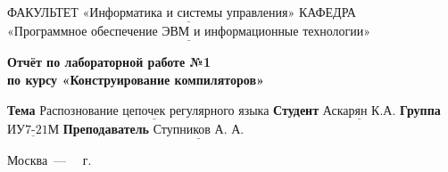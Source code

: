 \begin{titlepage}
	
	\noindent ФАКУЛЬТЕТ $\underline{\text{«Информатика и системы управления»}}$ \newline\newline
	\noindent КАФЕДРА $\underline{\text{«Программное обеспечение ЭВМ и информационные технологии»}}$\newline\newline\newline\newline\newline\newline\newline
	
	\vspace{\baselineskip}

	\begin{center}
		\Large\textbf{Отчёт по лабораторной работе №1} \\
		\Large\textbf{по курсу «Конструирование компиляторов»} \\

	\end{center}
	\begin{center}
		\large{}
	\end{center}
	\vspace{2.5cm}
	
	\noindent\textbf{Тема} $\underline{\text{Распознование цепочек регулярного языка}}$\newline\newline
	\noindent\textbf{Студент} $\underline{\text{Аскарян К.А.}}$\newline\newline
	\noindent\textbf{Группа} $\underline{\text{ИУ7-21М}}$\newline\newline
	\noindent\textbf{Преподаватель} $\underline{\text{Ступников~А.~А.}}$\newline
	
	\begin{center}
		\vfill
		Москва~---~\the\year
		~г.
	\end{center}
	\restoregeometry
\end{titlepage}
